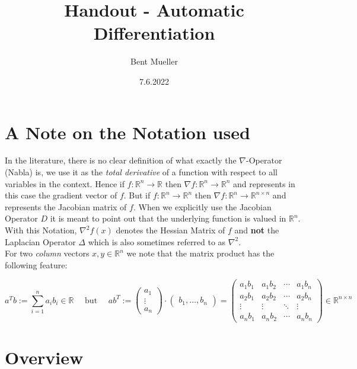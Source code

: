 \documentclass[11pt,a4paper]{article}
\def\R{{\mathbb R}}
\theoremstyle{definition} %
\begin{document}
\title{ \textbf{Handout - Automatic Differentiation} }
\author{Bent Mueller}
\date{7.6.2022}
\maketitle

\section{A Note on the Notation used}

In the literature, there is no clear definition of what exactly the
$\nabla$-Operator (Nabla) is, we use it as the \textit{total derivative}
of a function with respect to all variables in the context.
Hence if $f: \R^n \to \R$ then $\nabla f: \R^n \to \R^n$ and represents
in this case the gradient vector of $f$. But if $f: \R^n \to \R^n$ then
$\nabla f: \R^n \to \R^{n \times n}$ and represents the Jacobian matrix
of $f$. When we explicitly use the Jacobian Operator $D$ it is meant to point out
that the underlying function is valued in $\R^n$.
With this Notation, $\nabla ^2 f(x)$ denotes the Hessian Matrix of $f$ and
\textbf{not} the Laplacian Operator $\Delta$ which is also sometimes
referred to as $\nabla ^2$.
\\

For two \textit{column} vectors $x, y \in \R^n$ we note that the matrix product
has the following feature:

\[
	a^{T} b := \sum_{i=1}^n a_i b_i \in \R
	\quad
	\text{ but }
	\quad
	a b^{T} :=
	\begin{pmatrix} a_1 \\ \vdots \\ a_n \end{pmatrix}
	\cdot
	\begin{pmatrix}
		b_1, \ldots, b_n
	\end{pmatrix}
	=
	\begin{pmatrix}
		a_1 b_1 & a_1 b_2 & \cdots & a_1 b_n \\
		a_2 b_1 & a_2 b_2 & \cdots & a_2 b_n \\
		\vdots  & \vdots  & \ddots & \vdots  \\
		a_n b_1 & a_n b_2 & \cdots & a_n b_n
	\end{pmatrix}
	\in \R^{n \times n}
\]

\section{Overview}
\end{document}
